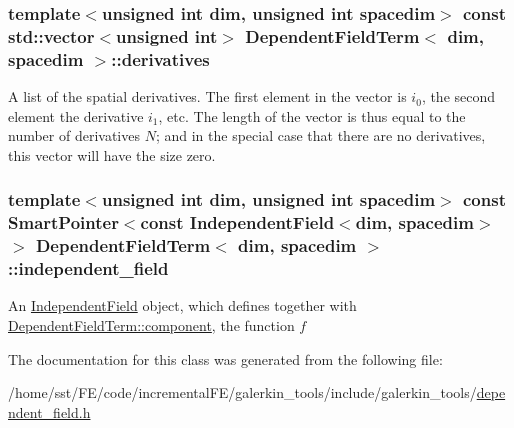 \subsubsection[{\texorpdfstring{derivatives}{derivatives}}]{\setlength{\rightskip}{0pt plus 5cm}template$<$unsigned int dim, unsigned int spacedim$>$ const std\+::vector$<$unsigned int$>$ {\bf Dependent\+Field\+Term}$<$ dim, spacedim $>$\+::derivatives}\hypertarget{class_dependent_field_term_af09c5452c3e8e71e9ee99db304b90135}{}\label{class_dependent_field_term_af09c5452c3e8e71e9ee99db304b90135}
A list of the spatial derivatives. The first element in the vector is $i_0$, the second element the derivative $i_1$, etc. The length of the vector is thus equal to the number of derivatives $N$; and in the special case that there are no derivatives, this vector will have the size zero. 
\subsubsection[{\texorpdfstring{independent\+\_\+field}{independent_field}}]{\setlength{\rightskip}{0pt plus 5cm}template$<$unsigned int dim, unsigned int spacedim$>$ const {\bf Smart\+Pointer}$<$const {\bf Independent\+Field}$<$dim, spacedim$>$ $>$ {\bf Dependent\+Field\+Term}$<$ dim, spacedim $>$\+::independent\+\_\+field}\hypertarget{class_dependent_field_term_a89d1c3fea36e6fe105232097a321e095}{}\label{class_dependent_field_term_a89d1c3fea36e6fe105232097a321e095}
An \hyperlink{class_independent_field}{Independent\+Field} object, which defines together with \hyperlink{class_dependent_field_term_ac6f3ac40d4ee2c8b9f9bbdfa34079b74}{Dependent\+Field\+Term\+::component}, the function $f$ 

The documentation for this class was generated from the following file\+:\begin{DoxyCompactItemize}
\item 
/home/sst/\+F\+E/code/incremental\+F\+E/galerkin\+\_\+tools/include/galerkin\+\_\+tools/\hyperlink{dependent__field_8h}{dependent\+\_\+field.\+h}\end{DoxyCompactItemize}
